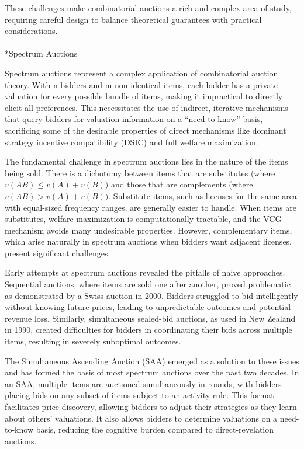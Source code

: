 \documentclass[
  letterpaper,
  numbers=noenddot,
  DIV=11]{scrreprt}
\makeatletter
\let\oldparagraph\paragraph
\renewcommand{\paragraph}{
    \@ifstar
      \xxxParagraphStar
      \xxxParagraphNoStar
  }
\newcommand{\xxxParagraphStar}[1]{\oldparagraph*{#1}\mbox{}}
\newcommand{\xxxParagraphNoStar}[1]{\oldparagraph{#1}\mbox{}}
\theoremstyle{plain}
\theoremstyle{definition}
\theoremstyle{plain}
\theoremstyle{remark}
\makeatother
\begin{document}
These challenges make combinatorial auctions a rich and complex area of
study, requiring careful design to balance theoretical guarantees with
practical considerations.

\paragraph*{Spectrum Auctions}\label{spectrum-auctions}

Spectrum auctions represent a complex application of combinatorial
auction theory. With n bidders and m non-identical items, each bidder
has a private valuation for every possible bundle of items, making it
impractical to directly elicit all preferences. This necessitates the
use of indirect, iterative mechanisms that query bidders for valuation
information on a ``need-to-know'' basis, sacrificing some of the
desirable properties of direct mechanisms like dominant strategy
incentive compatibility (DSIC) and full welfare maximization.

The fundamental challenge in spectrum auctions lies in the nature of the
items being sold. There is a dichotomy between items that are
substitutes (where \(v(AB) \leq v(A) + v(B))\) and those that are
complements (where \(v(AB) > v(A) + v(B))\). Substitute items, such as
licenses for the same area with equal-sized frequency ranges, are
generally easier to handle. When items are substitutes, welfare
maximization is computationally tractable, and the VCG mechanism avoids
many undesirable properties. However, complementary items, which arise
naturally in spectrum auctions when bidders want adjacent licenses,
present significant challenges.

Early attempts at spectrum auctions revealed the pitfalls of naive
approaches. Sequential auctions, where items are sold one after another,
proved problematic as demonstrated by a Swiss auction in 2000. Bidders
struggled to bid intelligently without knowing future prices, leading to
unpredictable outcomes and potential revenue loss. Similarly,
simultaneous sealed-bid auctions, as used in New Zealand in 1990,
created difficulties for bidders in coordinating their bids across
multiple items, resulting in severely suboptimal outcomes.

The Simultaneous Ascending Auction (SAA) emerged as a solution to these
issues and has formed the basis of most spectrum auctions over the past
two decades. In an SAA, multiple items are auctioned simultaneously in
rounds, with bidders placing bids on any subset of items subject to an
activity rule. This format facilitates price discovery, allowing bidders
to adjust their strategies as they learn about others' valuations. It
also allows bidders to determine valuations on a need-to-know basis,
reducing the cognitive burden compared to direct-revelation auctions.
\end{document}
